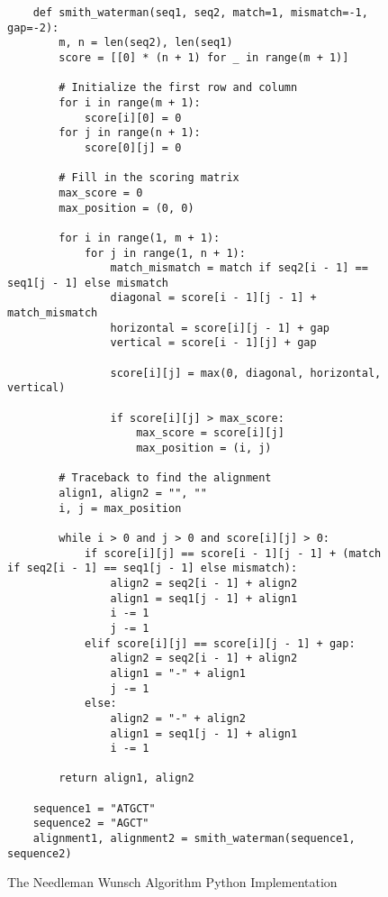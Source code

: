 \begin{figure}[H]
    \centering
    \begin{lstlisting}
    def smith_waterman(seq1, seq2, match=1, mismatch=-1, gap=-2):
        m, n = len(seq2), len(seq1)
        score = [[0] * (n + 1) for _ in range(m + 1)]
    
        # Initialize the first row and column
        for i in range(m + 1):
            score[i][0] = 0
        for j in range(n + 1):
            score[0][j] = 0
    
        # Fill in the scoring matrix
        max_score = 0
        max_position = (0, 0)
    
        for i in range(1, m + 1):
            for j in range(1, n + 1):
                match_mismatch = match if seq2[i - 1] == seq1[j - 1] else mismatch
                diagonal = score[i - 1][j - 1] + match_mismatch
                horizontal = score[i][j - 1] + gap
                vertical = score[i - 1][j] + gap
    
                score[i][j] = max(0, diagonal, horizontal, vertical)
    
                if score[i][j] > max_score:
                    max_score = score[i][j]
                    max_position = (i, j)
    
        # Traceback to find the alignment
        align1, align2 = "", ""
        i, j = max_position
    
        while i > 0 and j > 0 and score[i][j] > 0:
            if score[i][j] == score[i - 1][j - 1] + (match if seq2[i - 1] == seq1[j - 1] else mismatch):
                align2 = seq2[i - 1] + align2
                align1 = seq1[j - 1] + align1
                i -= 1
                j -= 1
            elif score[i][j] == score[i][j - 1] + gap:
                align2 = seq2[i - 1] + align2
                align1 = "-" + align1
                j -= 1
            else:
                align2 = "-" + align2
                align1 = seq1[j - 1] + align1
                i -= 1
    
        return align1, align2
    
    sequence1 = "ATGCT"
    sequence2 = "AGCT"
    alignment1, alignment2 = smith_waterman(sequence1, sequence2)
    \end{lstlisting}
    \caption{The Needleman Wunsch Algorithm Python Implementation}
    \label{fig:smith-waterman}
\end{figure}

